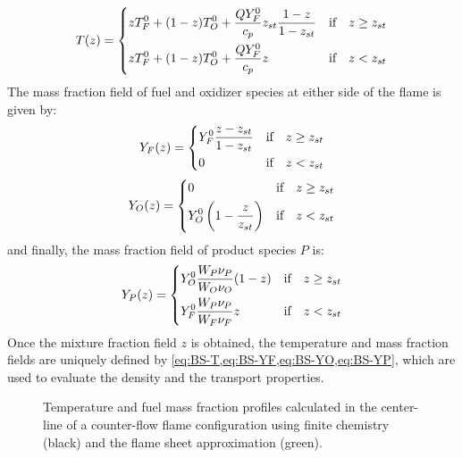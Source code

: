


\begin{equation}\label{eq:BS-T}
	T(z) =
	\begin{dcases}
		z T_F^0 + (1-z)T_O^0 + \frac{Q Y_F^0}{c_p}z_{st}\frac{1 - z}{1-z_{st}} & \text{if}\quad z \geq z_{st} \\
		z T_F^0 + (1-z)T_O^0 + \frac{Q Y_F^0}{c_p}z                            & \text{if}\quad z < z_{st}
	\end{dcases}
\end{equation}
The mass fraction field of fuel and oxidizer species at either side of the flame is given by:
\begin{equation}\label{eq:BS-YF}
	Y_F(z) =
	\begin{dcases}
		Y_F^0\frac{z - z_{st}}{1-z_{st}} & \text{if}\quad z \geq z_{st} \\
		0                                & \text{if} \quad z < z_{st}
	\end{dcases}
\end{equation}
\begin{equation}\label{eq:BS-YO}
	Y_O(z) =
	\begin{dcases}
		0                                         & \text{if} \quad z \geq z_{st} \\
		Y_O^0 \left( 1- \frac{z}{z_{st}}  \right) & \text{if} \quad z < z_{st}
	\end{dcases}
\end{equation}
and finally, the mass fraction field of product species $P$ is:
\begin{equation}\label{eq:BS-YP}
	Y_P(z) =
	\begin{dcases}
		Y_O^0\frac{W_P\nu_P}{W_O\nu_O}(1-z) & \text{if} \quad z \geq z_{st} \\
		Y_F^0\frac{W_P\nu_P}{W_F\nu_F}z     & \text{if} \quad z < z_{st}
	\end{dcases}
\end{equation}
Once the mixture fraction field $z$ is obtained, the temperature and mass fraction fields are uniquely defined by \cref{eq:BS-T,eq:BS-YF,eq:BS-YO,eq:BS-YP}, which are used to evaluate the density and the transport properties. 
\begin{figure}[tb]
	\centering
	\caption{ Temperature and fuel mass fraction profiles calculated in the center-line of a counter-flow flame configuration using finite chemistry (black) and the flame sheet approximation (green). }
	\label{fig:MixtureFraction_finiteRateComparison}
\end{figure}

